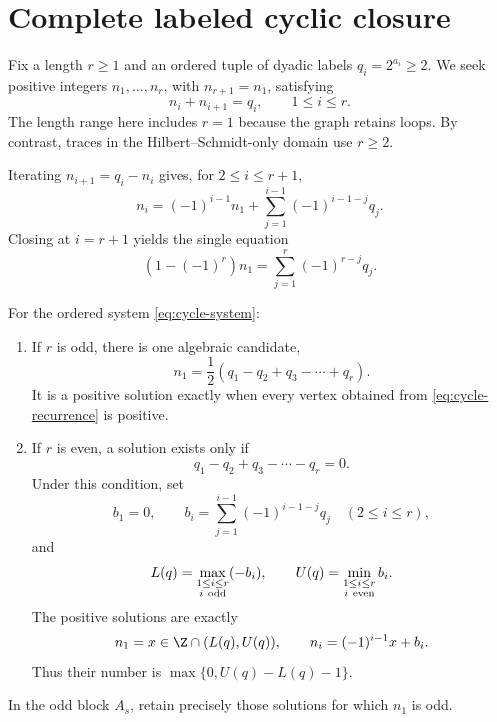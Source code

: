 \section{Complete labeled cyclic closure}
\label{sec:cycles}

Fix a length $r\ge1$ and an ordered tuple of dyadic labels
$q_i=2^{a_i}\ge2$.  We seek positive integers
$n_1,\ldots,n_r$, with $n_{r+1}=n_1$, satisfying
\begin{equation}
  n_i+n_{i+1}=q_i,\qquad 1\le i\le r.
  \label{eq:cycle-system}
\end{equation}
The length range here includes $r=1$ because the graph retains loops.  By
contrast, traces in the Hilbert--Schmidt-only domain use $r\ge2$.

Iterating $n_{i+1}=q_i-n_i$ gives, for $2\le i\le r+1$,
\begin{equation}
  n_i=(-1)^{i-1}n_1+
      \sum_{j=1}^{i-1}(-1)^{i-1-j}q_j.
  \label{eq:cycle-recurrence}
\end{equation}
Closing at $i=r+1$ yields the single equation
\begin{equation}
  (1-(-1)^r)n_1
  =\sum_{j=1}^r(-1)^{r-j}q_j.
  \label{eq:cycle-closing}
\end{equation}

\begin{theorem}
\label{thm:cycle-solver}
For the ordered system \cref{eq:cycle-system}:
\begin{enumerate}
  \item If $r$ is odd, there is one algebraic candidate,
  \begin{equation}
    n_1=\frac12(q_1-q_2+q_3-\cdots+q_r).
    \label{eq:odd-candidate}
  \end{equation}
  It is a positive solution exactly when every vertex obtained from
  \cref{eq:cycle-recurrence} is positive.
  \item If $r$ is even, a solution exists only if
  \begin{equation}
    q_1-q_2+q_3-\cdots-q_r=0.
    \label{eq:even-compatibility}
  \end{equation}
  Under this condition, set
  \begin{equation}
    b_1=0,\qquad
    b_i=\sum_{j=1}^{i-1}(-1)^{i-1-j}q_j\quad(2\le i\le r),
    \label{eq:bi-definition}
  \end{equation}
  and
  \begin{equation}
    L(q)=\max_{\substack{1\le i\le r\\i\ {\rm odd}}}(-b_i),
    \qquad
    U(q)=\min_{\substack{1\le i\le r\\i\ {\rm even}}}b_i.
    \label{eq:LU-definition}
  \end{equation}
  The positive solutions are exactly
  \begin{equation}
    n_1=x\in\Z\cap(L(q),U(q)),\qquad
    n_i=(-1)^{i-1}x+b_i.
    \label{eq:even-solutions}
  \end{equation}
  Thus their number is $\max\{0,U(q)-L(q)-1\}$.
\end{enumerate}
In the odd block $A_s$, retain precisely those solutions for which $n_1$
is odd.
\end{theorem}

